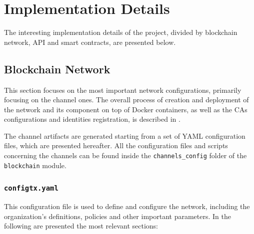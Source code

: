 \documentclass{scrartcl}
\begin{document}
\fi

\section{Implementation Details}

\iffalse

The interesting implementation details of the project, divided by blockchain network, API and smart contracts, are presented below.

\subsection{Blockchain Network}
\label{sec:blockchain-network-impl}

This section focuses on the most important network configurations, primarily focusing on the channel ones.
%
The overall process of creation and deployment of the network and its component on top of Docker containers, as well as the CAs configurations and identities registration, is described in .

The channel artifacts are generated starting from a set of YAML configuration files, which are presented hereafter.
%
All the configuration files and scripts concerning the channels can be found inside the \texttt{channels\_config} folder of the \texttt{blockchain} module.

\subsubsection*{\texttt{configtx.yaml}}

This configuration file is used to define and configure the network, including the organization's definitions, policies and other important parameters.
%
In the following are presented the most relevant sections:
\end{document}

